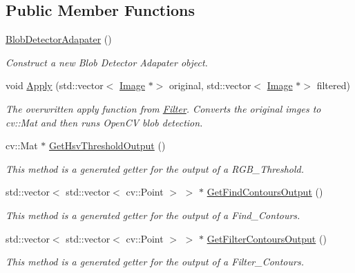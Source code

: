 \subsection*{Public Member Functions}
\begin{DoxyCompactItemize}
\item 
\mbox{\label{classBlobDetectorAdapater_a971b9d9cbbfb9bafed2d5401e344264d}} 
\hyperlink{classBlobDetectorAdapater_a971b9d9cbbfb9bafed2d5401e344264d}{Blob\+Detector\+Adapater} ()
\begin{DoxyCompactList}\small\item\em Construct a new Blob Detector Adapater object. \end{DoxyCompactList}\item 
void \hyperlink{classBlobDetectorAdapater_a24f99498567e7b20b58a62aba78a759c}{Apply} (std\+::vector$<$ \hyperlink{classImage}{Image} $\ast$$>$ original, std\+::vector$<$ \hyperlink{classImage}{Image} $\ast$$>$ filtered)
\begin{DoxyCompactList}\small\item\em The overwritten apply function from \hyperlink{classFilter}{Filter}. Converts the original imges to cv\+::\+Mat and then runs Open\+CV blob detection. \end{DoxyCompactList}\item 
cv\+::\+Mat $\ast$ \hyperlink{classBlobDetectorAdapater_ae6cd1a0e7c6fdb0cdacdeba7bf472398}{Get\+Hsv\+Threshold\+Output} ()
\begin{DoxyCompactList}\small\item\em This method is a generated getter for the output of a R\+G\+B\+\_\+\+Threshold. \end{DoxyCompactList}\item 
std\+::vector$<$ std\+::vector$<$ cv\+::\+Point $>$ $>$ $\ast$ \hyperlink{classBlobDetectorAdapater_a9e688d27a238071e9445c07ac69c4941}{Get\+Find\+Contours\+Output} ()
\begin{DoxyCompactList}\small\item\em This method is a generated getter for the output of a Find\+\_\+\+Contours. \end{DoxyCompactList}\item 
std\+::vector$<$ std\+::vector$<$ cv\+::\+Point $>$ $>$ $\ast$ \hyperlink{classBlobDetectorAdapater_a7271f0c7a2797336777651fd7079fda6}{Get\+Filter\+Contours\+Output} ()
\begin{DoxyCompactList}\small\item\em This method is a generated getter for the output of a Filter\+\_\+\+Contours. \end{DoxyCompactList}\end{DoxyCompactItemize}
